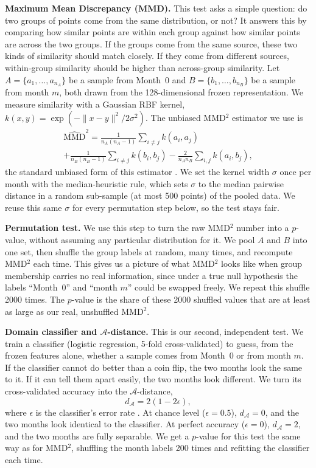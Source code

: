 \documentclass[journal]{IEEEtran}
\begin{document}
\textbf{Maximum Mean Discrepancy (MMD).} This test asks a simple question: do two groups of points come from the same distribution, or not? It answers this by comparing how similar points are within each group against how similar points are across the two groups. If the groups come from the same source, these two kinds of similarity should match closely. If they come from different sources, within-group similarity should be higher than across-group similarity. Let $A=\{a_1,\ldots,a_{n_A}\}$ be a sample from Month~0 and $B=\{b_1,\ldots,b_{n_B}\}$ be a sample from month $m$, both drawn from the 128-dimensional frozen representation. We measure similarity with a Gaussian RBF kernel, $k(x,y)=\exp(-\lVert x-y\rVert^2/2\sigma^2)$. The unbiased MMD$^2$ estimator we use is
\begin{multline}
\widehat{\mathrm{MMD}}^2 = \frac{1}{n_A(n_A-1)}\sum_{i\neq j} k(a_i,a_j) \\ + \frac{1}{n_B(n_B-1)}\sum_{i\neq j} k(b_i,b_j) - \frac{2}{n_A n_B}\sum_{i,j} k(a_i,b_j),
\label{eq:mmd}
\end{multline}
the standard unbiased form of this estimator \cite{Gretton2012MMD}. We set the kernel width $\sigma$ once per month with the median-heuristic rule, which sets $\sigma$ to the median pairwise distance in a random sub-sample (at most 500 points) of the pooled data. We reuse this same $\sigma$ for every permutation step below, so the test stays fair.

\textbf{Permutation test.} We use this step to turn the raw MMD$^2$ number into a $p$-value, without assuming any particular distribution for it. We pool $A$ and $B$ into one set, then shuffle the group labels at random, many times, and recompute MMD$^2$ each time. This gives us a picture of what MMD$^2$ looks like when group membership carries no real information, since under a true null hypothesis the labels ``Month~0'' and ``month $m$'' could be swapped freely. We repeat this shuffle 2000 times. The $p$-value is the share of these 2000 shuffled values that are at least as large as our real, unshuffled MMD$^2$.

\textbf{Domain classifier and $\mathcal{A}$-distance.} This is our second, independent test. We train a classifier (logistic regression, 5-fold cross-validated) to guess, from the frozen features alone, whether a sample comes from Month~0 or from month $m$. If the classifier cannot do better than a coin flip, the two months look the same to it. If it can tell them apart easily, the two months look different. We turn its cross-validated accuracy into the $\mathcal{A}$-distance,
\begin{equation}
d_{\mathcal{A}} = 2(1-2\epsilon),
\label{eq:adist}
\end{equation}
where $\epsilon$ is the classifier's error rate \cite{BenDavid2010Domain}. At chance level ($\epsilon=0.5$), $d_{\mathcal{A}}=0$, and the two months look identical to the classifier. At perfect accuracy ($\epsilon=0$), $d_{\mathcal{A}}=2$, and the two months are fully separable. We get a $p$-value for this test the same way as for MMD$^2$, shuffling the month labels 200 times and refitting the classifier each time.
\end{document}
